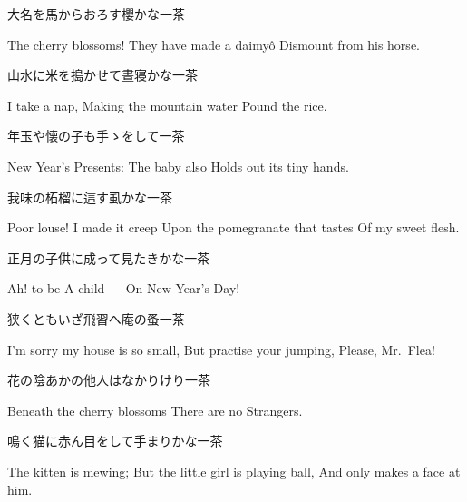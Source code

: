 \begin{haiku}
    {\FH 大名を馬からおろす櫻かな}\hfill{\FH 一茶}

    \vin{} The cherry blossoms!
    \vin{} \vin{} They have made a daimy\^o
    \vin{} \vin{} \vin{} Dismount from his horse.
\end{haiku}

\begin{haiku}
    {\FH 山水に米を搗かせて晝寝かな}\hfill{\FH 一茶}

    \vin{} I take a nap,
    \vin{} \vin{} Making the mountain water
    \vin{} \vin{} \vin{} Pound the rice.
\end{haiku}

\begin{haiku}
    {\FH 年玉や懐の子も手ゝをして}\hfill{\FH 一茶}

    \vin{} New Year's Presents:
    \vin{} \vin{} The baby also
    \vin{} \vin{} \vin{} Holds out its tiny hands.
\end{haiku}

\begin{haiku}
    {\FH 我味の柘榴に這す虱かな}\hfill{\FH 一茶}

    \vin{} Poor louse! I made it creep
    \vin{} \vin{} Upon the pomegranate that tastes
    \vin{} \vin{} \vin{} Of my sweet flesh.
\end{haiku}

\begin{haiku}
    {\FH 正月の子供に成って見たきかな}\hfill{\FH 一茶}

    \vin{} Ah! to be
    \vin{} \vin{} A child ---
    \vin{} \vin{} \vin{} On New Year's Day!
\end{haiku}

\begin{haiku}
    {\FH 狭くともいざ飛習へ庵の蚤}\hfill{\FH 一茶}

    \vin{} I'm sorry my house is so small,
    \vin{} \vin{} But practise your jumping,
    \vin{} \vin{} \vin{} Please, Mr.\ Flea!
\end{haiku}

\begin{haiku}
    {\FH 花の陰あかの他人はなかりけり}\hfill{\FH 一茶}

    \vin{} Beneath the cherry blossoms
    \vin{} \vin{} There are no
    \vin{} \vin{} \vin{} Strangers.
\end{haiku}

\begin{haiku}
    {\FH 鳴く猫に赤ん目をして手まりかな}\hfill{\FH 一茶}

    \vin{} The kitten is mewing;
    \vin{} \vin{} But the little girl is playing ball,
    \vin{} \vin{} \vin{} And only makes a face at him.
\end{haiku}

